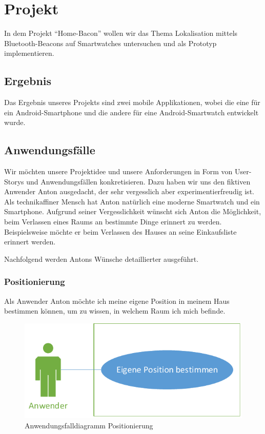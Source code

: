 \section{Projekt}

In dem Projekt "`Home-Bacon"' wollen wir das Thema Lokalisation mittels Bluetooth-Beacons auf Smartwatches untersuchen und als Prototyp implementieren.

\subsection{Ergebnis}
Das Ergebnis unseres Projekts sind zwei mobile Applikationen, wobei die eine für ein Android-Smartphone und die andere für eine Android-Smartwatch entwickelt wurde.

\subsection{Anwendungsfälle}
\label{sec:useCases}
Wir möchten unsere Projektidee und unsere Anforderungen in Form von User-Storys und Anwendungsfällen konkretisieren. Dazu haben wir uns den fiktiven Anwender Anton ausgedacht, der sehr vergesslich aber experimentierfreudig ist. Als technikaffiner Mensch hat Anton natürlich eine moderne Smartwatch und ein Smartphone. Aufgrund seiner Vergesslichkeit wünscht sich Anton die Möglichkeit, beim Verlassen eines Raums an bestimmte Dinge erinnert zu werden. Beispielsweise möchte er beim Verlassen des Hauses an seine Einkaufsliste erinnert werden.

Nachfolgend werden Antons Wünsche detaillierter ausgeführt.

\subsubsection{Positionierung}
Als Anwender Anton möchte ich meine eigene Position in meinem Haus bestimmen können, um zu wissen, in welchem Raum ich mich befinde. 

\begin{figure}[H]
\centering
\includegraphics[width=0.54\linewidth]{Bilder/UseCase-Position}
\caption{Anwendungsfalldiagramm Positionierung}
\label{fig:UseCase-Position}
\end{figure}

